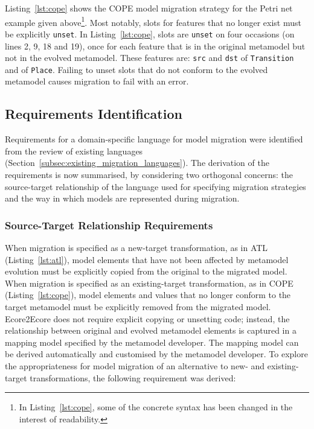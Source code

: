 Listing~\ref{lst:cope} shows the COPE model migration strategy for the Petri net example given above\footnote{In Listing~\ref{lst:cope}, some of the concrete syntax has been changed in the interest of readability.}. Most notably, slots for features that no longer exist must be explicitly \texttt{unset}. In Listing~\ref{lst:cope}, slots are \texttt{unset} on four occasions (on lines 2, 9, 18 and 19), once for each feature that is in the original metamodel but not in the evolved metamodel. These features are: \texttt{src} and \texttt{dst} of \texttt{Transition} and of \texttt{Place}. Failing to unset slots that do not conform to the evolved metamodel causes migration to fail with an error.

\subsection{Requirements Identification}
\label{subsec:analysis}
Requirements for a domain-specific language for model migration were identified from the review of existing languages (Section~\ref{subsec:existing_migration_languages}). The derivation of the requirements is now summarised, by considering two orthogonal concerns: the source-target relationship of the language used for specifying migration strategies and the way in which models are represented during migration. %


\subsubsection{Source-Target Relationship Requirements}
When migration is specified as a new-target transformation, as in ATL (Listing~\ref{lst:atl}), model elements that have not been affected by metamodel evolution must be explicitly copied from the original to the migrated model. When migration is specified as an existing-target transformation, as in COPE (Listing~\ref{lst:cope}), model elements and values that no longer conform to the target metamodel must be explicitly removed from the migrated model. Ecore2Ecore does not require explicit copying or unsetting code; instead, the relationship between original and evolved metamodel elements is captured in a mapping model specified by the metamodel developer. The mapping model can be derived automatically and customised by the metamodel developer. To explore the appropriateness for model migration of an alternative to new- and existing-target transformations, the following requirement was derived:

